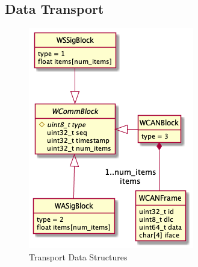 \documentclass[letterpaper,twocolumn,12pt]{article}
\begin{document}
\subsection{Data Transport}
\begin{figure}[]
    \centering
    \includegraphics[width=\linewidth]{out/images/data_structures/data_structures.png}
    \caption{Transport Data Structures}
    \label{fig:ds}
\end{figure}
\end{document}
